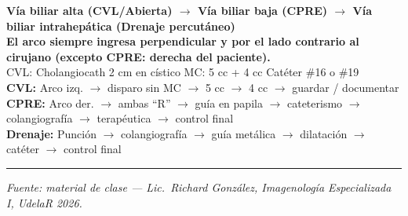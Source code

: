 \begin{cajakeypoints}
	\begin{center}
		\textbf{\color{azulprincipal}
			Vía biliar alta (CVL/Abierta) $\rightarrow$ Vía biliar baja (CPRE) $\rightarrow$ Vía biliar intrahepática (Drenaje percutáneo)}\\[0.4em]
		\textbf{\color{naranjadestacado}
			El arco siempre ingresa perpendicular y por el lado contrario al cirujano (excepto CPRE: derecha del paciente).}\\[0.3em]
		CVL: Cholangiocath 2 cm en cístico \quad MC: 5 cc + 4 cc \quad Catéter \#16 o \#19 \\[0.3em]
		\textbf{CVL:} Arco izq. $\to$ disparo sin MC $\to$ 5 cc $\to$ 4 cc $\to$ guardar / documentar \\[0.3em]
		\textbf{CPRE:} Arco der. $\to$ ambas ``R'' $\to$ guía en papila $\to$ cateterismo $\to$ colangiografía $\to$ terapéutica $\to$ control final \\[0.3em]
		\textbf{Drenaje:} Punción $\to$ colangiografía $\to$ guía metálica $\to$ dilatación $\to$ catéter $\to$ control final
	\end{center}
\end{cajakeypoints}

\vspace{1em}
\hrule
\vspace{0.5em}
{\footnotesize \textit{Fuente: material de clase --- Lic.\ Richard González,
		Imagenología Especializada I, UdelaR 2026.}}